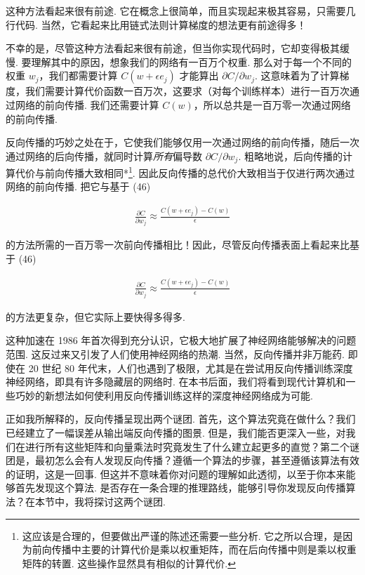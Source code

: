 这种方法看起来很有前途. 它在概念上很简单，而且实现起来极其容易，只需要几行代码. 当然，它看起来比用链式法则计算梯度的想法更有前途得多！

不幸的是，尽管这种方法看起来很有前途，但当你实现代码时，它却变得极其缓慢. 要理解其中的原因，想象我们的网络有一百万个权重. 那么对于每一个不同的权重 $w_j$，我们都需要计算 $C(w+\epsilon e_j)$ 才能算出 $\partial C / \partial w_j$. 这意味着为了计算梯度，我们需要计算代价函数一百万次，这要求（对每个训练样本）进行一百万次通过网络的前向传播. 我们还需要计算 $C(w)$，所以总共是一百万零一次通过网络的前向传播.

反向传播的巧妙之处在于，它使我们能够仅用一次通过网络的前向传播，随后一次通过网络的后向传播，就同时计算\emph{所有}偏导数 $\partial C / \partial w_j$. 粗略地说，后向传播的计算代价与前向传播大致相同*\footnote{这应该是合理的，但要做出严谨的陈述还需要一些分析. 它之所以合理，是因为前向传播中主要的计算代价是乘以权重矩阵，而在后向传播中则是乘以权重矩阵的转置. 这些操作显然具有相似的计算代价.}. 因此反向传播的总代价大致相当于仅进行两次通过网络的前向传播. 把它与基于 (46)

\begin{align*}
\frac{\partial C}{\partial w_{j}} \approx \frac{C(w+\epsilon e_j)-C(w)}{\epsilon} \nonumber
\end{align*}

\noindent 的方法所需的一百万零一次前向传播相比！因此，尽管反向传播表面上看起来比基于 (46)

\begin{align*}
\frac{\partial C}{\partial w_{j}} \approx \frac{C(w+\epsilon e_j)-C(w)}{\epsilon} \nonumber
\end{align*}

\noindent 的方法更复杂，但它实际上要快得多得多.

这种加速在 1986 年首次得到充分认识，它极大地扩展了神经网络能够解决的问题范围. 这反过来又引发了人们使用神经网络的热潮. 当然，反向传播并非万能药. 即使在 20 世纪 80 年代末，人们也遇到了极限，尤其是在尝试用反向传播训练深度神经网络，即具有许多隐藏层的网络时. 在本书后面，我们将看到现代计算机和一些巧妙的新想法如何使利用反向传播训练这样的深度神经网络成为可能.

正如我所解释的，反向传播呈现出两个谜团. 首先，这个算法究竟在做什么？我们已经建立了一幅误差从输出端反向传播的图景. 但是，我们能否更深入一些，对我们在进行所有这些矩阵和向量乘法时究竟发生了什么建立起更多的直觉？第二个谜团是，最初怎么会有人发现反向传播？遵循一个算法的步骤，甚至遵循该算法有效的证明，这是一回事. 但这并不意味着你对问题的理解如此透彻，以至于你本来能够首先发现这个算法. 是否存在一条合理的推理路线，能够引导你发现反向传播算法？在本节中，我将探讨这两个谜团.

